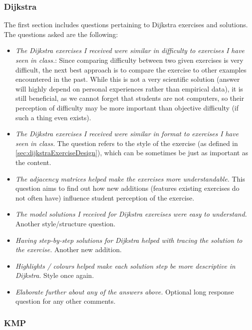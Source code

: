 \documentclass{l4proj}
\begin{document}
\subsubsection{Dijkstra}

The first section includes questions pertaining to Dijkstra exercises and solutions. The questions asked are the following:

\begin{itemize}
	\item
	\emph{The Dijkstra exercises I received were similar in difficulty to exercises I have seen in class.}: Since comparing difficulty between two given exercises is very difficult, the next best approach is to compare the exercise to other examples encountered in the past. While this is not a very scientific solution (answer will highly depend on personal experiences rather than empirical data), it is still beneficial, as we cannot forget that students are not computers, so their perception of difficulty may be more important than objective difficulty (if such a thing even exists).
	\item
	\emph{The Dijkstra exercises I received were similar in format to exercises I have seen in class.} The question refers to the style of the exercise (as defined in \autoref{sec:dijkstraExerciseDesign}), which can be sometimes be just as important as the content.
	\item
	\emph{The adjacency matrices helped make the exercises more understandable.} This question aims to find out how new additions (features existing exercises do not often have) influence student perception of the exercise.
	\item
	\emph{The model solutions I received for Dijkstra exercises were easy to understand.} Another style/structure question.
	\item
	\emph{Having step-by-step solutions for Dijkstra helped with tracing the solution to the exercise.} Another new addition.
	\item
	\emph{Highlights / colours helped make each solution step be more descriptive in Dijkstra.} Style once again.
	\item
	\emph{Elaborate further about any of the answers above.} Optional long response question for any other comments.
\end{itemize}

\subsubsection{KMP}
\end{document}
